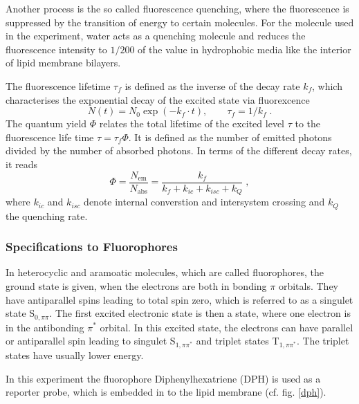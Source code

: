 \documentclass{scrartcl}
\numberwithin{equation}{section}
\numberwithin{figure}{section}
\numberwithin{table}{section}
\newcommand{\eq}[2]{\begin{equation}#1\label{#2}\end{equation}}
\begin{document}
Another process is the so called fluorescence quenching, where the fluorescence is suppressed by the transition of energy to certain molecules. For the molecule used in the experiment, water acts as a quenching molecule and reduces the fluorescence intensity to $1/200$ of the value in hydrophobic media like the interior of lipid membrane bilayers.

The fluorescence lifetime $\tau_f$ is defined as the inverse of the decay rate $k_f$, which characterises the exponential decay of the excited state via fluorexcence
\eq{N(t) =N_0 \exp (-k_f \cdot  t) , \qquad \tau_f=1/k_f \; .}{rate}
The quantum yield $\Phi$ relates the total lifetime of the excited level $\tau$ to the fluorescence life time $\tau = \tau_f \Phi$. It is defined as the number of emitted photons divided by the number of absorbed photons. In terms of the different decay rates, it reads
\eq{\Phi = \frac{N_\text{em}}{N_\text{abs}} = \frac{k_f}{k_f +k_{ic} + k_{isc} + k_Q} \; ,}{yield}
where $k_{ic}$ and $k_{isc}$ denote internal converstion and intersystem crossing and $k_Q$ the quenching rate.



\subsubsection{Specifications to Fluorophores}
In heterocyclic and aramoatic molecules, which are called fluorophores, the ground state is given, when the electrons are both in bonding $\pi$ orbitals. They have antiparallel spins leading to total spin zero, which is referred to as a singulet state S$_{0,\pi\pi}$. The first excited electronic state is then a state, where one electron is in the antibonding $\pi^*$ orbital. In this excited state, the electrons can have parallel or antiparallel spin leading to singulet S$_{1, \pi \pi^*}$ and triplet states T$_{1, \pi \pi^*}$. The triplet states have usually lower energy.

In this experiment the fluorophore Diphenylhexatriene (DPH) is used as a reporter probe, which is embedded in to the lipid membrane (cf. fig. \ref{dph}).
\end{document}
